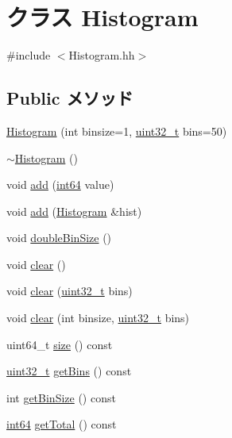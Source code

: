 \hypertarget{classHistogram}{
\section{クラス Histogram}
\label{classHistogram}
}


{\ttfamily \#include $<$Histogram.hh$>$}\subsection*{Public メソッド}
\begin{DoxyCompactItemize}
\item 
\hyperlink{classHistogram_a0be7c28fa0c035b0409c970625b6ebe9}{Histogram} (int binsize=1, \hyperlink{Type_8hh_a435d1572bf3f880d55459d9805097f62}{uint32\_\-t} bins=50)
\item 
\hyperlink{classHistogram_a17481d27b81a3cc32c8a688e020ece88}{$\sim$Histogram} ()
\item 
void \hyperlink{classHistogram_a34a320889bb2239a3345be43348c95d1}{add} (\hyperlink{TypeDefines_8hh_aecfc3c54bd29ad5964e1c1c3ccbf89df}{int64} value)
\item 
void \hyperlink{classHistogram_a6972d61e24903eef8ec9dad439b69cdd}{add} (\hyperlink{classHistogram}{Histogram} \&hist)
\item 
void \hyperlink{classHistogram_a56d229242423dc417ab298e43fdef39f}{doubleBinSize} ()
\item 
void \hyperlink{classHistogram_ac8bb3912a3ce86b15842e79d0b421204}{clear} ()
\item 
void \hyperlink{classHistogram_ab376d229b7b9b610068bb5bb8150c3b2}{clear} (\hyperlink{Type_8hh_a435d1572bf3f880d55459d9805097f62}{uint32\_\-t} bins)
\item 
void \hyperlink{classHistogram_af93bb19bb9a576789fa3bd81bed3d26e}{clear} (int binsize, \hyperlink{Type_8hh_a435d1572bf3f880d55459d9805097f62}{uint32\_\-t} bins)
\item 
uint64\_\-t \hyperlink{classHistogram_a0b6868dbef44fc07f11d050eb59e5f7e}{size} () const 
\item 
\hyperlink{Type_8hh_a435d1572bf3f880d55459d9805097f62}{uint32\_\-t} \hyperlink{classHistogram_ae09c0cf5b67690adac0d882ffd3e40df}{getBins} () const 
\item 
int \hyperlink{classHistogram_a6bc601db303f3dfda909618c78ec02e7}{getBinSize} () const 
\item 
\hyperlink{TypeDefines_8hh_aecfc3c54bd29ad5964e1c1c3ccbf89df}{int64} \hyperlink{classHistogram_a6a790b6f2643bd10f3d74c41d9afefd6}{getTotal} () const 

\end{DoxyCompactItemize}
